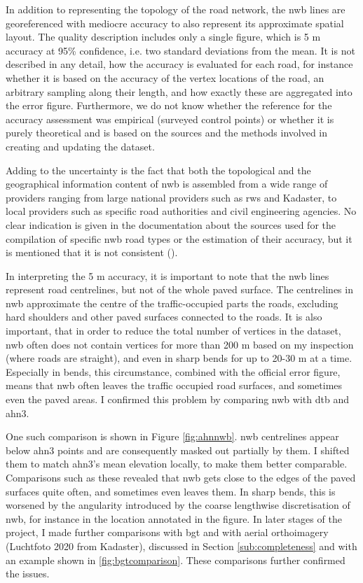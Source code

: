 In addition to representing the topology of the road network, the \ac{nwb} lines are georeferenced with mediocre accuracy to also represent its approximate spatial layout. The quality description includes only a single figure, which is 5 m accuracy at 95\% confidence, i.e. two standard deviations from the mean. It is not described in any detail, how the accuracy is evaluated for each road, for instance whether it is based on the accuracy of the vertex locations of the road, an arbitrary sampling along their length, and how exactly these are aggregated into the error figure. Furthermore, we do not know whether the reference for the accuracy assessment was empirical (surveyed control points) or whether it is purely theoretical and is based on the sources and the methods involved in creating and updating the dataset.

Adding to the uncertainty is the fact that both the topological and the geographical information content of \ac{nwb} is assembled from a wide range of providers ranging from large national providers such as \ac{rws} and Kadaster, to local providers such as specific road authorities and civil engineering agencies. No clear indication is given in the documentation about the sources used for the compilation of specific \ac{nwb} road types or the estimation of their accuracy, but it is mentioned that it is not consistent (\cite{nwb_docs}).

In interpreting the 5 m accuracy, it is important to note that the \ac{nwb} lines represent road centrelines, but not of the whole paved surface. The centrelines in \ac{nwb} approximate the centre of the traffic-occupied parts the roads, excluding hard shoulders and other paved surfaces connected to the roads. It is also important, that in order to reduce the total number of vertices in the dataset, \ac{nwb} often does not contain vertices for more than 200 m based on my inspection (where roads are straight), and even in sharp bends for up to 20-30 m at a time. Especially in bends, this circumstance, combined with the official error figure, means that \ac{nwb} often leaves the traffic occupied road surfaces, and sometimes even the paved areas. I confirmed this problem by comparing \ac{nwb} with \ac{dtb} and \ac{ahn3}.

One such comparison is shown in Figure \ref{fig:ahnnwb}. \ac{nwb} centrelines appear below \ac{ahn3} points and are consequently masked out partially by them. I shifted them to match \ac{ahn3}'s mean elevation locally, to make them better comparable. Comparisons such as these revealed that \ac{nwb} gets close to the edges of the paved surfaces quite often, and sometimes even leaves them. In sharp bends, this is worsened by the angularity introduced by the coarse lengthwise discretisation of \ac{nwb}, for instance in the location annotated in the figure. In later stages of the project, I made further comparisons with \ac{bgt} and with aerial orthoimagery (Luchtfoto 2020 from Kadaster), discussed in Section \ref{sub:completeness} and with an example shown in \ref{fig:bgtcomparison}. These comparisons further confirmed the issues.

